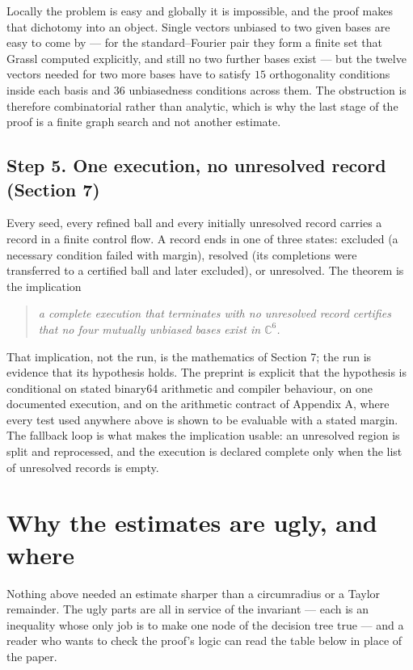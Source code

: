 \documentclass[11pt]{article}
\theoremstyle{definition}
\theoremstyle{plain}
\theoremstyle{definition}
\newcommand{\C}{\mathbb{C}}
\newenvironment{claim}{\begin{quote}\itshape}{\end{quote}}
\begin{document}
\begin{ideabox}
Locally the problem is easy and globally it is impossible, and the proof makes that dichotomy into
an object. Single vectors unbiased to two given bases are easy to come by --- for the
standard--Fourier pair they form a finite set that Grassl computed explicitly, and still no two
further bases exist --- but the twelve vectors needed for two more bases have to satisfy $15$ orthogonality conditions inside each basis and $36$ unbiasedness
conditions across them. The obstruction is therefore combinatorial rather than analytic, which is why
the last stage of the proof is a finite graph search and not another estimate.
\end{ideabox}

\subsection*{Step 5. One execution, no unresolved record (Section 7)}

Every seed, every refined ball and every initially unresolved record carries a record in a finite
control flow. A record ends in one of three states: excluded (a necessary condition failed with
margin), resolved (its completions were transferred to a certified ball and later excluded), or
unresolved. The theorem is the implication

\begin{claim}
a complete execution that terminates with no unresolved record certifies that no four mutually
unbiased bases exist in $\C^6$.
\end{claim}

That implication, not the run, is the mathematics of Section 7; the run is evidence that its
hypothesis holds. The preprint is explicit that the hypothesis is conditional on stated binary64
arithmetic and compiler behaviour, on one documented execution, and on the arithmetic contract of
Appendix A, where every test used anywhere above is shown to be evaluable with a stated margin. The
fallback loop is what makes the implication usable: an unresolved region is split and reprocessed,
and the execution is declared complete only when the list of unresolved records is empty.

\section{Why the estimates are ugly, and where}

Nothing above needed an estimate sharper than a circumradius or a Taylor remainder. The ugly parts
are all in service of the invariant --- each is an inequality whose only job is to make one node of
the decision tree true --- and a reader who wants to check the proof's logic can read the table below
in place of the paper.
\end{document}
